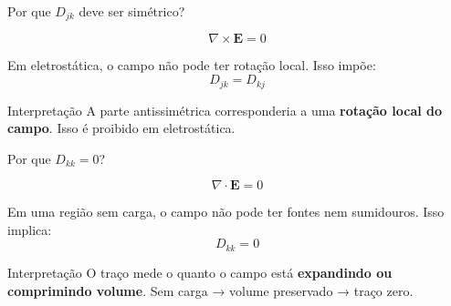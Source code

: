 \documentclass[aspectratio=169,11pt]{beamer}
\begin{document}
\begin{frame}{Por que \(D_{jk}\) deve ser simétrico?}

\begin{eqbox}
\begin{equation}
\nabla \times \mathbf{E} = 0
\end{equation}
\end{eqbox}

\vspace{0.2cm}

\begin{mybox}
\justifying
Em eletrostática, o campo não pode ter rotação local.
Isso impõe:
\[
D_{jk} = D_{kj}
\]
\end{mybox}

\vspace{0.2cm}

\begin{alertblock}{Interpretação}
A parte antissimétrica corresponderia a uma \textbf{rotação local do campo}.  
Isso é proibido em eletrostática.
\end{alertblock}

\end{frame}

\begin{frame}{Por que \(D_{kk}=0\)?}

\begin{eqbox}
\begin{equation}
\nabla \cdot \mathbf{E} = 0
\end{equation}
\end{eqbox}

\vspace{0.2cm}

\begin{mybox}
\justifying
Em uma região sem carga, o campo não pode ter fontes nem sumidouros.
Isso implica:
\[
D_{kk} = 0
\]
\end{mybox}

\vspace{0.2cm}

\begin{alertblock}{Interpretação}
O traço mede o quanto o campo está \textbf{expandindo ou comprimindo volume}.  
Sem carga → volume preservado → traço zero.
\end{alertblock}

\end{frame}
\end{document}
